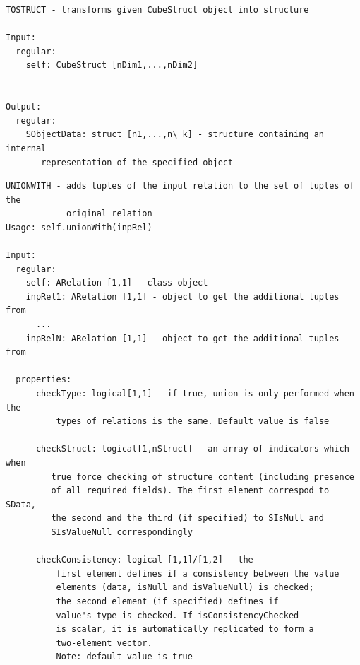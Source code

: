 \documentclass[letterpaper,10pt,english]{sphinxmanual}
\begin{document}
\label{chap_func:smartdb-relations-atypifiedstaticrelation-tostruct}
\begin{Verbatim}[commandchars=\\\{\}]
TOSTRUCT - transforms given CubeStruct object into structure

Input:
  regular:
    self: CubeStruct [nDim1,...,nDim2]


Output:
  regular:
    SObjectData: struct [n1,...,n\_k] - structure containing an internal
       representation of the specified object
\end{Verbatim}
\label{chap_func:smartdb-relations-atypifiedstaticrelation-unionwith}
\begin{Verbatim}[commandchars=\\\{\}]
UNIONWITH - adds tuples of the input relation to the set of tuples of the
            original relation
Usage: self.unionWith(inpRel)

Input:
  regular:
    self: ARelation [1,1] - class object
    inpRel1: ARelation [1,1] - object to get the additional tuples from
      ...
    inpRelN: ARelation [1,1] - object to get the additional tuples from

  properties:
      checkType: logical[1,1] - if true, union is only performed when the
          types of relations is the same. Default value is false

      checkStruct: logical[1,nStruct] - an array of indicators which when
         true force checking of structure content (including presence
         of all required fields). The first element correspod to SData,
         the second and the third (if specified) to SIsNull and
         SIsValueNull correspondingly

      checkConsistency: logical [1,1]/[1,2] - the
          first element defines if a consistency between the value
          elements (data, isNull and isValueNull) is checked;
          the second element (if specified) defines if
          value's type is checked. If isConsistencyChecked
          is scalar, it is automatically replicated to form a
          two-element vector.
          Note: default value is true
\end{Verbatim}
\label{chap_func:smartdb-relations-atypifiedstaticrelation-unionwithalongdim}
\end{document}
